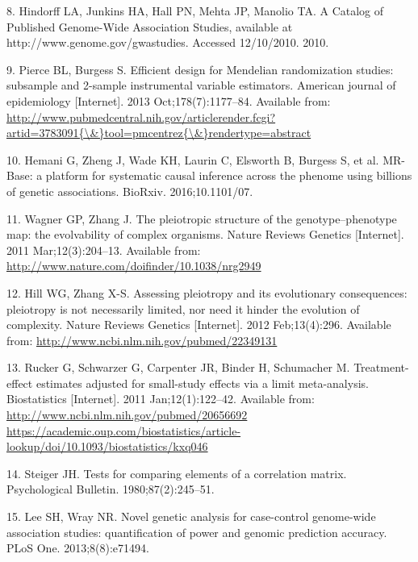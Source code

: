 \documentclass[]{article}
\begin{document}
\hypertarget{ref-Hindorff2010}{}
8. Hindorff LA, Junkins HA, Hall PN, Mehta JP, Manolio TA. A Catalog of
Published Genome-Wide Association Studies, available at
http://www.genome.gov/gwastudies. Accessed 12/10/2010. 2010.

\hypertarget{ref-Pierce2013}{}
9. Pierce BL, Burgess S. Efficient design for Mendelian randomization
studies: subsample and 2-sample instrumental variable estimators.
American journal of epidemiology {[}Internet{]}. 2013
Oct;178(7):1177--84. Available from:
\href{http://www.pubmedcentral.nih.gov/articlerender.fcgi?artid=3783091\%7B/\&\%7Dtool=pmcentrez\%7B/\&\%7Drendertype=abstract}{http://www.pubmedcentral.nih.gov/articlerender.fcgi?artid=3783091\{\textbackslash{}\&\}tool=pmcentrez\{\textbackslash{}\&\}rendertype=abstract}

\hypertarget{ref-Hemani2016}{}
10. Hemani G, Zheng J, Wade KH, Laurin C, Elsworth B, Burgess S, et al.
MR-Base: a platform for systematic causal inference across the phenome
using billions of genetic associations. BioRxiv. 2016;10.1101/07.

\hypertarget{ref-Wagner2011}{}
11. Wagner GP, Zhang J. The pleiotropic structure of the
genotype--phenotype map: the evolvability of complex organisms. Nature
Reviews Genetics {[}Internet{]}. 2011 Mar;12(3):204--13. Available from:
\url{http://www.nature.com/doifinder/10.1038/nrg2949}

\hypertarget{ref-Hill2012a}{}
12. Hill WG, Zhang X-S. Assessing pleiotropy and its evolutionary
consequences: pleiotropy is not necessarily limited, nor need it hinder
the evolution of complexity. Nature Reviews Genetics {[}Internet{]}.
2012 Feb;13(4):296. Available from:
\url{http://www.ncbi.nlm.nih.gov/pubmed/22349131}

\hypertarget{ref-Rucker2011}{}
13. Rucker G, Schwarzer G, Carpenter JR, Binder H, Schumacher M.
Treatment-effect estimates adjusted for small-study effects via a limit
meta-analysis. Biostatistics {[}Internet{]}. 2011 Jan;12(1):122--42.
Available from:
\href{http://www.ncbi.nlm.nih.gov/pubmed/20656692\%20https://academic.oup.com/biostatistics/article-lookup/doi/10.1093/biostatistics/kxq046}{http://www.ncbi.nlm.nih.gov/pubmed/20656692 https://academic.oup.com/biostatistics/article-lookup/doi/10.1093/biostatistics/kxq046}

\hypertarget{ref-Steiger1980}{}
14. Steiger JH. Tests for comparing elements of a correlation matrix.
Psychological Bulletin. 1980;87(2):245--51.

\hypertarget{ref-Lee2013c}{}
15. Lee SH, Wray NR. Novel genetic analysis for case-control genome-wide
association studies: quantification of power and genomic prediction
accuracy. PLoS One. 2013;8(8):e71494.
\end{document}
